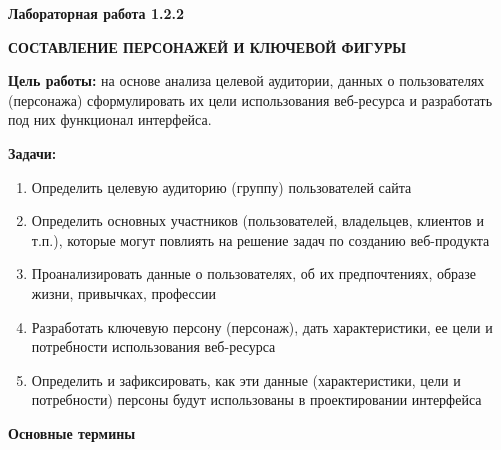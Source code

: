 
\graphicspath{ {1.2.2/models/} }

\pagestyle{fancy}
\fancyhead{}
\renewcommand{\headrulewidth}{0pt}


\begin{center}
    \textbf{Лабораторная работа 1.2.2}

    \textbf{СОСТАВЛЕНИЕ ПЕРСОНАЖЕЙ И КЛЮЧЕВОЙ ФИГУРЫ}
\end{center}

\textbf{Цель работы:} на основе анализа целевой аудитории, данных о пользователях (персонажа) сформулировать их цели использования веб-ресурса и разработать под них функционал интерфейса.
\bigskip

\textbf{Задачи:}

\begin{enumerate}
    \item Определить целевую аудиторию (группу) пользователей сайта 
    \item Определить основных участников (пользователей, владельцев, клиентов и т.п.), которые могут повлиять на решение задач по созданию веб-продукта
    \item Проанализировать данные о пользователях, об их предпочтениях, образе жизни, привычках, профессии
    \item Разработать ключевую персону (персонаж), дать характеристики, ее цели и потребности использования веб-ресурса
    \item Определить и зафиксировать, как эти данные (характеристики, цели и потребности) персоны будут использованы в проектировании интерфейса
\end{enumerate}
\bigskip

\textbf{Основные термины}

